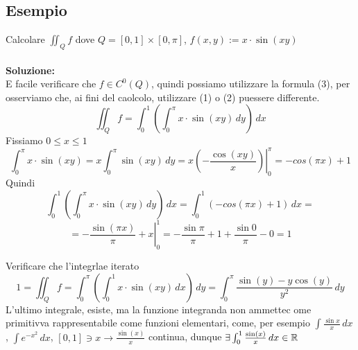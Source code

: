 \subsection{Esempio}
\begin{example}
  Calcolare $\iint_{Q} f$ dove $Q = [0,1]\times[0,\pi]$, $f(x,y):=x\cdot \sin(xy)$ \\\\
  \textbf{Soluzione:} \\
  \ac{E} facile verificare che $f \in C^0(Q)$, quindi possiamo utilizzare la formula (3), per\aco
  osserviamo che, ai fini del caolcolo, utilizzare (1) o (2) pu\aco essere differente.
  $$\iint_{Q}f = \int_{0}^{1}\left(\int_{0}^{\pi} x\cdot \sin(xy) \, dy\right) \, dx$$
  Fissiamo $0 \leq x \leq 1$
  $$\int_{0}^{\pi} x\cdot \sin(xy) = x \int_{0}^{\pi} \sin(xy) \, dy = x \left. \left(-\frac{\cos(xy)}{x}\right) \right|_{0}^{\pi}
  = -cos(\pi x)+1$$
  Quindi 
  $$\int_{0}^{1}\left(\int_{0}^{\pi}  x\cdot \sin(xy) \, dy\right)\, dx = 
  \int_{0}^{1} \left(-cos(\pi x)+1\right) \, dx =$$
  $$= \left. - \frac{\sin(\pi x)}{\pi} + x \right|_{0}^{1} = -\frac{\sin\pi}{\pi} + 1 + \frac{\sin0}{\pi} - 0 = 1$$
  \begin{exercise}
    Verificare che l'integrlae iterato 
    $$1 = \iint_{Q} f = \int_{0}^{\pi} \left(\int_{0}^{1} x\cdot \sin(xy) \, dx\right) \, dy = 
    \int_{0}^{\pi} \frac{\sin(y) - y\cos(y)}{y^2} \, dy$$
    L'ultimo integrale, esiste, ma la funzione integranda non ammettec ome primitivva rappresentabile come funzioni 
    elementari, come, per esempio $\int \frac{\sin{x}}{x}\,dx$, $\int e^{-x^2} \,dx$, 
    $[0,1]\ni x \to \frac{\sin(x)}{x}$ \ace continua, dunque $\exists \int_{0}^{1} \frac{\sin(x)}{x} \, dx \in \mathbb{R}$
  \end{exercise}
\end{example}